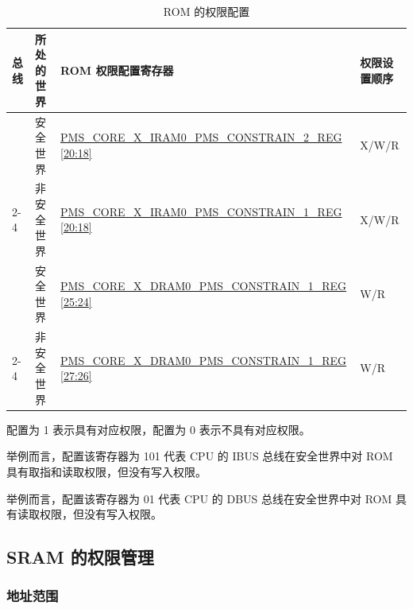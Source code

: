 \documentclass[main\_\_CN.tex]{subfiles}
\begin{document}
\begin{table}[H]
    \centering
    \caption{ROM 的权限配置}
    \label{tab:permctrl-rom_permconfig}
    \begin{threeparttable}
    \begin{tabular}{|l|l|l|l|}
        \hline
        \rowcolor{lightgray}
        \textbf{总线} & \textbf{所处的世界} & \textbf{ROM 权限配置寄存器\tnote{A}}                         & \textbf{权限设置顺序} \\ \hline
                     & 安全世界      & \hyperref[regdesc:PMSCOREXIRAM0PMSCONSTRAIN2REG]{PMS\_CORE\_X\_IRAM0\_PMS\_CONSTRAIN\_2\_REG   {[}20:18{]}} \tnote{B} & X/W/R           \\ \cline{2-4}
        \multirow{-2}{*}{IBUS} & 非安全世界 & \hyperref[regdesc:PMSCOREXIRAM0PMSCONSTRAIN1REG]{PMS\_CORE\_X\_IRAM0\_PMS\_CONSTRAIN\_1\_REG {[}20:18{]}}    & X/W/R \\ \hline
                     & 安全世界      & \hyperref[regdesc:PMSCOREXDRAM0PMSCONSTRAIN1REG]{PMS\_CORE\_X\_DRAM0\_PMS\_CONSTRAIN\_1\_REG   {[}25:24{]}}\tnote{C} & W/R             \\ \cline{2-4}
        \multirow{-2}{*}{DBUS} & 非安全世界 & \hyperref[regdesc:PMSCOREXDRAM0PMSCONSTRAIN1REG]{PMS\_CORE\_X\_DRAM0\_PMS\_CONSTRAIN\_1\_REG   {[}27:26{]}} & W/R   \\ \hline
        \end{tabular}
        \begin{tablenotes}
        \item[A] 配置为 1 表示具有对应权限，配置为 0 表示不具有对应权限。
        \item[B] 举例而言，配置该寄存器为 101 代表 CPU 的 IBUS 总线在安全世界中对 ROM 具有取指和读取权限，但没有写入权限。
        \item[C] 举例而言，配置该寄存器为 01 代表 CPU 的 DBUS 总线在安全世界中对 ROM 具有读取权限，但没有写入权限。
        \end{tablenotes}
     \end{threeparttable}
    \end{table}

\subsection{SRAM 的权限管理}

\subsubsection{地址范围}
\end{document}
